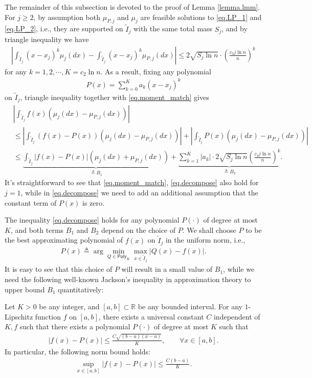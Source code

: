 \documentclass[final,12pt]{colt2018} %
\begin{document}
The remainder of this subsection is devoted to the proof of Lemma \ref{lemma.lmm}. For $j\ge 2$, by assumption both $\mu_{P,j}$ and $\mu_j$ are feasible solutions to \eqref{eq.LP_1} and \eqref{eq.LP_2}, i.e., they are supported on $\tilde{I}_j$ with the same total mass $S_j$, and by triangle inequality we have
\begin{align}\label{eq.moment_match}
\left|\int_{\tilde{I}_j} (x-x_j)^k\mu_j(dx) - \int_{\tilde{I}_j} (x-x_j)^k\mu_{P,j}(dx)\right| \le 2\sqrt{S_j\ln n}\cdot\left(\frac{c_3j\ln n}{n}\right)^k
\end{align}
for any $k=1,2,\cdots,K=c_2\ln n$. As a result, fixing any polynomial
\begin{align*}
P(x) = \sum_{k=0}^K a_k(x-x_j)^k
\end{align*}
on $\tilde{I}_j$, triangle inequality together with \eqref{eq.moment_match} gives
\begin{align}
&\left|\int_{\tilde{I}_j} f(x)(\mu_j(dx)-\mu_{P,j}(dx))\right| \nonumber\\
&\le \left|\int_{\tilde{I}_j} (f(x)-P(x))(\mu_j(dx)-\mu_{P,j}(dx))\right| + \left|\int_{\tilde{I}_j} P(x)(\mu_j(dx)-\mu_{P,j}(dx))\right| \nonumber\\
&\le \underbrace{\int_{\tilde{I}_j} |f(x)-P(x)|(\mu_j(dx) + \mu_{P,j}(dx))}_{\triangleq B_1} + \underbrace{\sum_{k=1}^K |a_k|\cdot 2\sqrt{S_j\ln n}\left(\frac{c_3j\ln n}{n}\right)^k}_{\triangleq B_2} \label{eq.decompose}.
\end{align}
It's straightforward to see that \eqref{eq.moment_match}, \eqref{eq.decompose} also hold for $j=1$, while in \eqref{eq.decompose} we need to add an additional assumption that the constant term of $P(x)$ is zero. 

The inequality \eqref{eq.decompose} holds for any polynomial $P(\cdot)$ of degree at most $K$, and both terms $B_1$ and $B_2$ depend on the choice of $P$. We shall choose $P$ to be the best approximating polynomial of $f(x)$ on $\tilde{I}_j$ in the uniform norm, i.e.,
\begin{align*}
P(x) \triangleq \arg\min_{Q\in \mathsf{Poly}_K} \max_{x\in \tilde{I}_j} |Q(x) - f(x)|.
\end{align*}
It is easy to see that this choice of $P$ will result in a small value of $B_1$, while we need the following well-known Jackson's inequality in approximation theory to upper bound $B_1$ quantitatively:
\begin{lemma}\cite{devore1976degree}
	Let $K>0$ be any integer, and $[a,b]\subset \mathbb{R}$ be any bounded interval. For any $1$-Lipschitz function $f$ on $[a,b]$, there exists a universal constant $C$ independent of $K,f$ such that there exists a polynomial $P(\cdot)$ of degree at most $K$ such that
	\begin{align}\label{eq.approx_pointwise}
	|f(x) - P(x)| \le \frac{C\sqrt{(b-a)(x-a)}}{K}, \qquad \forall x\in [a,b].
	\end{align}
	In particular, the following norm bound holds:
	\begin{align}\label{eq.approx_norm}
	\sup_{x\in [a,b]} |f(x)-P(x)| \le \frac{C(b-a)}{K}.
	\end{align}
\end{lemma}
\end{document}
